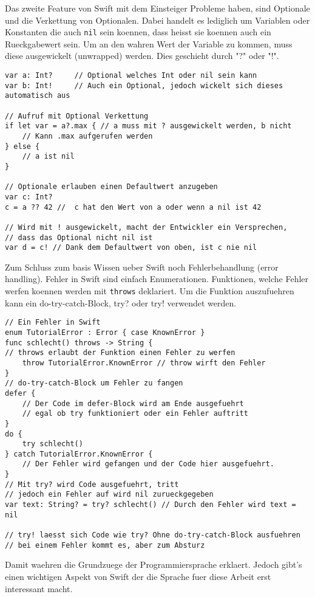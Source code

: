 Das zweite Feature von Swift mit dem Einsteiger Probleme haben, sind Optionale und die Verkettung von Optionalen. Dabei handelt es lediglich um Variablen oder Konstanten die auch \lstinline{nil} sein koennen, dass heisst sie koennen auch ein Rueckgabewert sein. Um an den wahren Wert der Variable zu kommen, muss diese ausgewickelt (unwrapped) werden. Dies geschieht durch "?" oder "!". 
\begin{lstlisting}
var a: Int? 	// Optional welches Int oder nil sein kann
var b: Int! 	// Auch ein Optional, jedoch wickelt sich dieses automatisch aus

// Aufruf mit Optional Verkettung
if let var = a?.max { // a muss mit ? ausgewickelt werden, b nicht
	// Kann .max aufgerufen werden
} else {
	// a ist nil
}

// Optionale erlauben einen Defaultwert anzugeben
var c: Int?
c = a ?? 42 //  c hat den Wert von a oder wenn a nil ist 42

// Wird mit ! ausgewickelt, macht der Entwickler ein Versprechen,
// dass das Optional nicht nil ist
var d = c! // Dank dem Defaultwert von oben, ist c nie nil
\end{lstlisting}
Zum Schluss zum basis Wissen ueber Swift noch Fehlerbehandlung (error handling). Fehler in Swift sind einfach Enumerationen. Funktionen, welche Fehler werfen koennen werden mit \lstinline{throws} deklariert. Um die Funktion auszufuehren kann ein do-try-catch-Block, try? oder try! verwendet werden.
\begin{lstlisting}
// Ein Fehler in Swift
enum TutorialError : Error { case KnownError }
func schlecht() throws -> String { 
// throws erlaubt der Funktion einen Fehler zu werfen
    throw TutorialError.KnownError // throw wirft den Fehler
}
// do-try-catch-Block um Fehler zu fangen
defer {
    // Der Code im defer-Block wird am Ende ausgefuehrt
    // egal ob try funktioniert oder ein Fehler auftritt
}
do {
    try schlecht()
} catch TutorialError.KnownError {
    // Der Fehler wird gefangen und der Code hier ausgefuehrt.
}
// Mit try? wird Code ausgefuehrt, tritt
// jedoch ein Fehler auf wird nil zurueckgegeben
var text: String? = try? schlecht() // Durch den Fehler wird text = nil

// try! laesst sich Code wie try? Ohne do-try-catch-Block ausfuehren
// bei einem Fehler kommt es, aber zum Absturz 
\end{lstlisting}
Damit waehren die Grundzuege der Programmiersprache erklaert. Jedoch gibt’s einen wichtigen Aspekt von Swift der die Sprache fuer diese Arbeit erst interessant  macht.
